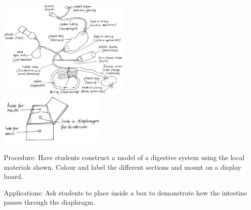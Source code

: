 \begin{multicols}{2}
\begin{center}
\includegraphics[width=0.49\textwidth]{./img/vso/digestive-sys-model.jpg} \\[6pt]
\includegraphics[width=0.4\textwidth]{./img/vso/digestive-sys-model-2.jpg}
\end{center}

\begin{description*}
\item[Procedure:]{Have students construct a model of a digestive system using the local materials shown. Colour and label the different sections and mount on a display board. }
\item[Applications:]{Ask students to place inside a box to demonstrate how the intestine passes through the diaphragm.}
\end{description*}


\end{multicols}
